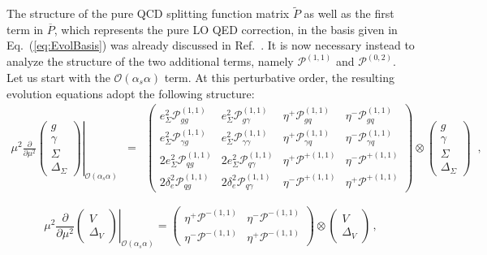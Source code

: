 The structure of the pure QCD splitting function matrix
$\widetilde{P}$ as well as the first term in $\overline{P}$, which
represents the pure LO QED correction, in the basis given in
Eq.~(\ref{eq:EvolBasis}) was already discussed in
Ref.~\cite{Bertone:2015lqa}.
%
It is now necessary instead to analyze the
structure of the two additional terms, namely $\mathcal{P}^{(1,1)}$ and
$\mathcal{P}^{(0,2)}$.
%
Let us start with the
$\mathcal{O}(\alpha_s\alpha)$ term.
%
At this perturbative order, the resulting evolution
equations adopt the following structure:
\begin{equation}
\begin{array}{rcl}
\displaystyle\left.\mu^2\frac{\partial}{\partial \mu^2}
\begin{pmatrix}
g\\
\gamma\\
\Sigma\\
\Delta_\Sigma
\end{pmatrix}
\right|_{\mathcal{O}(\alpha_s \alpha)} &=& \displaystyle \begin{pmatrix}
e_\Sigma^2 \mathcal{P}^{(1,1)}_{gg}      & e_\Sigma^2 \mathcal{P}^{(1,1)}_{g\gamma} & \eta^+\mathcal{P}^{(1,1)}_{gq} & \eta^-\mathcal{P}^{(1,1)}_{gq} \\
e_\Sigma^2 \mathcal{P}^{(1,1)}_{\gamma g} & e_\Sigma^2 \mathcal{P}^{(1,1)}_{\gamma\gamma} & \eta^+\mathcal{P}^{(1,1)}_{\gamma q} &\eta^-\mathcal{P}^{(1,1)}_{\gamma q} \\
2 e_\Sigma^2 \mathcal{P}^{(1,1)}_{qg}    & 2 e_\Sigma^2 \mathcal{P}^{(1,1)}_{q\gamma} & \eta^+\mathcal{P}^{+(1,1)}  & \eta^-\mathcal{P}^{+(1,1)}\\
2 \delta_e^2 \mathcal{P}^{(1,1)}_{qg} & 2 \delta_e^2 \mathcal{P}^{(1,1)}_{q\gamma} &\eta^-\mathcal{P}^{+(1,1)} &\eta^+\mathcal{P}^{+(1,1)}
\end{pmatrix}\otimes
\begin{pmatrix}
g\\
\gamma\\
\Sigma\\
\Delta_\Sigma
\end{pmatrix}
\end{array}\,,
\end{equation}

\begin{equation}
\displaystyle\left.\mu^2\frac{\partial}{\partial \mu^2}
\begin{pmatrix}
V\\
\Delta_V
\end{pmatrix} \right|_{\mathcal{O}(\alpha_s \alpha)}= 
\begin{pmatrix}
\eta^+\mathcal{P}^{-(1,1)} & \eta^-\mathcal{P}^{-(1,1)} \\
\eta^-\mathcal{P}^{-(1,1)} & \eta^+\mathcal{P}^{-(1,1)} 
\end{pmatrix}\otimes
\begin{pmatrix}
V\\
\Delta_V
\end{pmatrix}\,,
\end{equation}

